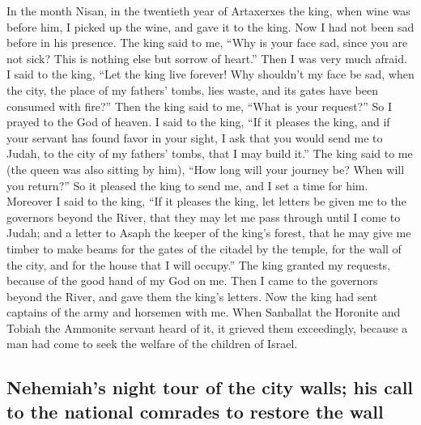  In the month Nisan, in the twentieth year of Artaxerxes
the king, when wine was before him, I picked up the wine, and gave it to
the king. Now I had not been sad before in his presence. 
The king said to me, ``Why is your face sad, since you are not sick?
This is nothing else but sorrow of heart.'' Then I was very much afraid.
 I said to the king, ``Let the king live forever! Why
shouldn't my face be sad, when the city, the place of my fathers' tombs,
lies waste, and its gates have been consumed with fire?'' 
Then the king said to me, ``What is your request?'' So I prayed to the
God of heaven.  I said to the king, ``If it pleases the
king, and if your servant has found favor in your sight, I ask that you
would send me to Judah, to the city of my fathers' tombs, that I may
build it.''  The king said to me (the queen was also
sitting by him), ``How long will your journey be? When will you
return?'' So it pleased the king to send me, and I set a time for him.
 Moreover I said to the king, ``If it pleases the king,
let letters be given me to the governors beyond the River, that they may
let me pass through until I come to Judah;  and a letter
to Asaph the keeper of the king's forest, that he may give me timber to
make beams for the gates of the citadel by the temple, for the wall of
the city, and for the house that I will occupy.'' The king granted my
requests, because of the good hand of my God on me.  Then
I came to the governors beyond the River, and gave them the king's
letters. Now the king had sent captains of the army and horsemen with
me.  When Sanballat the Horonite and Tobiah the Ammonite
servant heard of it, it grieved them exceedingly, because a man had come
to seek the welfare of the children of Israel.

\hypertarget{nehemiahs-night-tour-of-the-city-walls-his-call-to-the-national-comrades-to-restore-the-wall}{%
\subsection{Nehemiah's night tour of the city walls; his call to the
national comrades to restore the
wall}\label{nehemiahs-night-tour-of-the-city-walls-his-call-to-the-national-comrades-to-restore-the-wall}}

